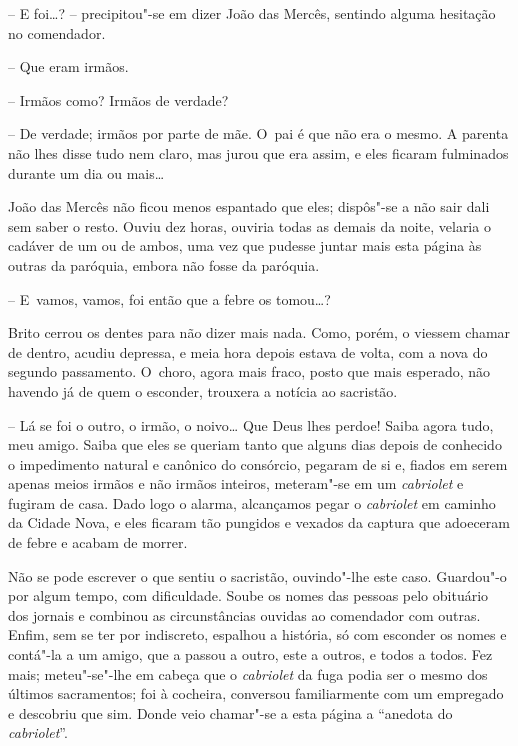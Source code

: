 -- E foi\ldots{}? -- precipitou"-se em dizer João das Mercês, sentindo alguma
hesitação no comendador.

-- Que eram irmãos.

-- Irmãos como? Irmãos de verdade?

-- De verdade; irmãos por parte de mãe. O~pai é que não era o mesmo. A
parenta não lhes disse tudo nem claro, mas jurou que era assim, e eles
ficaram fulminados durante um dia ou mais\ldots{}

João das Mercês não ficou menos espantado que eles; dispôs"-se a não sair
dali sem saber o resto. Ouviu dez horas, ouviria todas as demais da
noite, velaria o cadáver de um ou de ambos, uma vez que pudesse juntar
mais esta página às outras da paróquia, embora não fosse da paróquia.

-- E~vamos, vamos, foi então que a febre os tomou\ldots{}?

Brito cerrou os dentes para não dizer mais nada. Como, porém, o viessem
chamar de dentro, acudiu depressa, e meia hora depois estava de volta,
com a nova do segundo passamento. O~choro, agora mais fraco, posto que
mais esperado, não havendo já de quem o esconder, trouxera a notícia ao
sacristão.

-- Lá se foi o outro, o irmão, o noivo\ldots{} Que Deus lhes perdoe! Saiba
agora tudo, meu amigo. Saiba que eles se queriam tanto que alguns dias
depois de conhecido o impedimento natural e canônico do consórcio,
pegaram de si e, fiados em serem apenas meios irmãos e não irmãos
inteiros, meteram"-se em um \emph{cabriolet} e fugiram de casa. Dado logo
o alarma, alcançamos pegar o \emph{cabriolet} em caminho da Cidade Nova,
e eles ficaram tão pungidos e vexados da captura que adoeceram de febre
e acabam de morrer.

Não se pode escrever o que sentiu o sacristão, ouvindo"-lhe este caso.
Guardou"-o por algum tempo, com dificuldade. Soube os nomes das pessoas
pelo obituário dos jornais e combinou as circunstâncias ouvidas ao
comendador com outras. Enfim, sem se ter por indiscreto, espalhou a
história, só com esconder os nomes e contá"-la a um amigo, que a passou a
outro, este a outros, e todos a todos. Fez mais; meteu"-se"-lhe em cabeça
que o \emph{cabriolet} da fuga podia ser o mesmo dos últimos
sacramentos; foi à cocheira, conversou familiarmente com um empregado e
descobriu que sim. Donde veio chamar"-se a esta página a ``anedota do
\emph{cabriolet}''.
